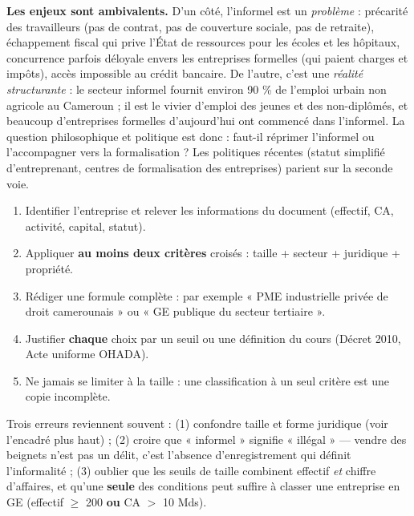 \documentclass[11pt]{article}
\begin{document}
\textbf{Les enjeux sont ambivalents.} D'un côté, l'informel est un \emph{problème} : précarité des travailleurs (pas de contrat, pas de couverture sociale, pas de retraite), échappement fiscal qui prive l'État de ressources pour les écoles et les hôpitaux, concurrence parfois déloyale envers les entreprises formelles (qui paient charges et impôts), accès impossible au crédit bancaire. De l'autre, c'est une \emph{réalité structurante} : le secteur informel fournit environ 90 \% de l'emploi urbain non agricole au Cameroun ; il est le vivier d'emploi des jeunes et des non-diplômés, et beaucoup d'entreprises formelles d'aujourd'hui ont commencé dans l'informel. La question philosophique et politique est donc : faut-il réprimer l'informel ou l'accompagner vers la formalisation ? Les politiques récentes (statut simplifié d'entreprenant, centres de formalisation des entreprises) parient sur la seconde voie.

\begin{methode}
\begin{enumerate}
\item Identifier l'entreprise et relever les informations du document (effectif, CA, activité, capital, statut).
\item Appliquer \textbf{au moins deux critères} croisés : taille + secteur + juridique + propriété.
\item Rédiger une formule complète : par exemple « PME industrielle privée de droit camerounais » ou « GE publique du secteur tertiaire ».
\item Justifier \textbf{chaque} choix par un seuil ou une définition du cours (Décret 2010, Acte uniforme OHADA).
\item Ne jamais se limiter à la taille : une classification à un seul critère est une copie incomplète.
\end{enumerate}
\end{methode}

\begin{attention}
Trois erreurs reviennent souvent : (1) confondre taille et forme juridique (voir l'encadré plus haut) ; (2) croire que « informel » signifie « illégal » — vendre des beignets n'est pas un délit, c'est l'absence d'enregistrement qui définit l'informalité ; (3) oublier que les seuils de taille combinent effectif \emph{et} chiffre d'affaires, et qu'une \textbf{seule} des conditions peut suffire à classer une entreprise en GE (effectif $\ge$ 200 \textbf{ou} CA $>$ 10 Mds).
\end{attention}
\end{document}
